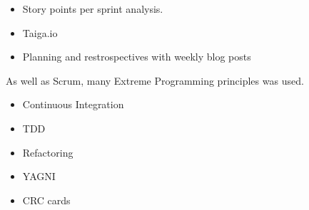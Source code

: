 \begin{itemize}
  \item Story points per sprint analysis.
  \item Taiga.io
  \item Planning and restrospectives with weekly blog posts
\end{itemize}

As well as Scrum, many Extreme Programming principles was used.
\begin{itemize}
  \item Continuous Integration
  \item TDD
  \item Refactoring
  \item YAGNI
  \item CRC cards

\end{itemize}

